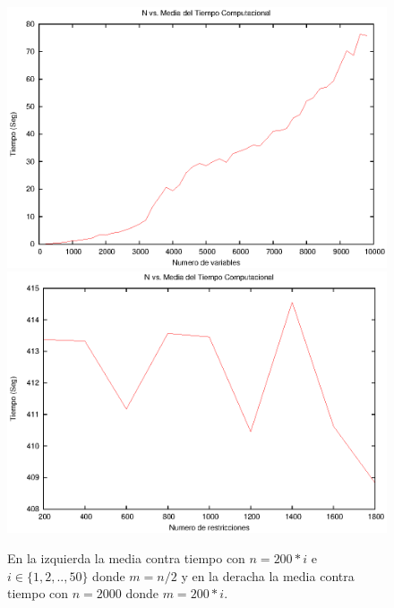 \begin{figure}[h]
\center
\includegraphics[scale=0.6]{img/Media_Tiempo_1.eps}
%
\includegraphics[scale=0.6]{img/Media_Tiempo_2.eps}
\caption{En la izquierda la media contra tiempo con $n=200*i$ e $i \in \{1,2,..,50 \}$ donde $m=n/2$ y en la deracha la media contra tiempo con $n=2000$ donde $m=200*i$.}
\label{img:Media}
\end{figure}

